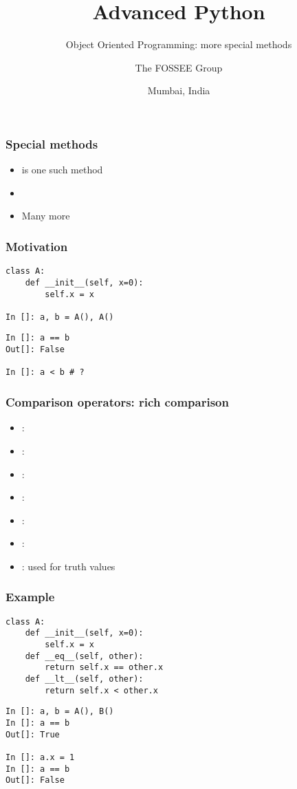 \documentclass[14pt,compress,aspectratio=169]{beamer}
\title[OOP: more special methods]{Advanced Python}
\subtitle{Object Oriented Programming: more special methods}
\author[FOSSEE] {The FOSSEE Group}
\institute[IIT Bombay] {Department of Aerospace Engineering\\IIT Bombay}
\date[] {Mumbai, India}
\begin{document}
\begin{frame}
  \titlepage
\end{frame}

\begin{frame}
  \frametitle{Special methods}
  \begin{itemize}
  \item {} is one such method
  \item {}
  \item Many more
  \end{itemize}
\end{frame}

\begin{frame}[fragile]
  \frametitle{Motivation}
\begin{lstlisting}
class A:
    def __init__(self, x=0):
        self.x = x

In []: a, b = A(), A()
\end{lstlisting}
\pause
\begin{lstlisting}
In []: a == b
Out[]: False

In []: a < b # ?
\end{lstlisting}
\end{frame}


\begin{frame}[fragile]
  \frametitle{Comparison operators: rich comparison}
  \begin{itemize}
  \item {}: 
  \item {}: 
  \item {}: 
  \item {}: 
  \item {}: 
  \item {}: 
    \vspace*{0.2in}
  \item {}: used for truth values
  \end{itemize}
\end{frame}

\begin{frame}[fragile]
  \frametitle{Example}
  \small
\begin{lstlisting}
class A:
    def __init__(self, x=0):
        self.x = x
    def __eq__(self, other):
        return self.x == other.x
    def __lt__(self, other):
        return self.x < other.x
\end{lstlisting}
  \pause
\begin{lstlisting}
In []: a, b = A(), B()
In []: a == b
Out[]: True

In []: a.x = 1
In []: a == b
Out[]: False
\end{lstlisting}
\end{frame}
\end{document}
